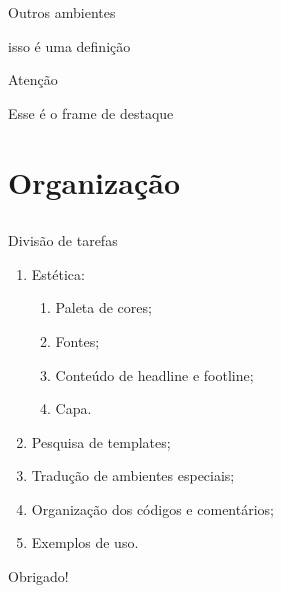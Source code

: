 \documentclass[aspectratio = 169]{beamer}
\begin{document}
    \begin{frame}{Outros ambientes}
        \begin{definition}
            isso é uma definição
        \end{definition}
    \end{frame}

    \begin{framedestaque}{Atenção}

    Esse é o frame de destaque
        
    \end{framedestaque}

\section{Organização}
\subsection{}

    \begin{frame}{Divisão de tarefas}

    \begin{enumerate}
        \item<1-> Estética:
        \begin{enumerate}
            \item<1-> Paleta de cores;
            \item<1-> Fontes;
            \item<1-> Conteúdo de headline e footline;
            \item<1-> Capa.
        \end{enumerate}
        \item<2-> Pesquisa de templates;
        \item<2-> Tradução de ambientes especiais;
        \item<2-> Organização dos códigos e comentários;
        \item<2-> Exemplos de uso.
        
        
    \end{enumerate}
        
    \end{frame}

    \begin{framedestaque}{Obrigado!}
        
    \end{framedestaque}
\end{document}
